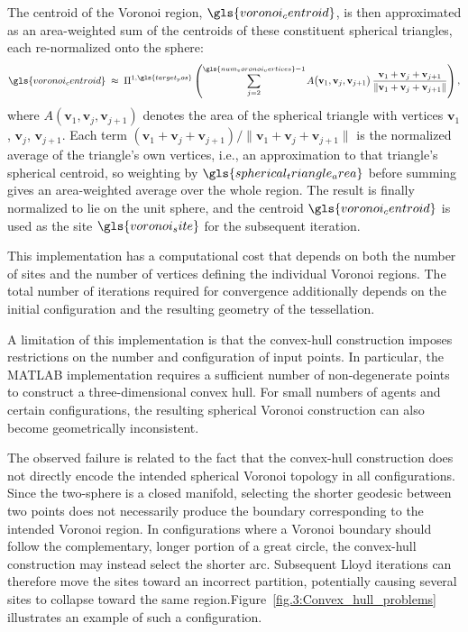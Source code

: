 The centroid of the Voronoi region, $\gls{voronoi_centroid}$, is then approximated as
an area-weighted sum of the centroids of these constituent spherical
triangles, each re-normalized onto the sphere:
\begin{equation}
\gls{voronoi_centroid} \;\approx\; \Pi^{1,\gls{target_pos}} \left( 
    \sum_{j=2}^{\gls{num_voronoi_vertices}-1}
    A \big(\mathbf{v}_1, \mathbf{v}_j, \mathbf{v}_{j+1}\big)\,
    \frac{\mathbf{v}_1 + \mathbf{v}_j + \mathbf{v}_{j+1}}{\left\| \mathbf{v}_1 + \mathbf{v}_j + \mathbf{v}_{j+1} \right\|}
\right)
,
\end{equation}
where $A(\mathbf{v}_1, \mathbf{v}_j, \mathbf{v}_{j+1})$
denotes the area of the spherical triangle with vertices $\mathbf{v}_1$, $\mathbf{v}_j$,
$\mathbf{v}_{j+1}$. Each term
$(\mathbf{v}_1 + \mathbf{v}_j + \mathbf{v}_{j+1})/\|\mathbf{v}_1 + \mathbf{v}_j + \mathbf{v}_{j+1}\|$
is the normalized average of the triangle's own vertices, i.e., an approximation to
that triangle's spherical centroid, so weighting by $\gls{spherical_triangle_area}$
before summing gives an area-weighted average over the whole region. The result is
finally normalized to lie on the unit sphere, and the centroid $\gls{voronoi_centroid}$ is used as
the site $\gls{voronoi_site}$ for the subsequent iteration.

This implementation has a computational cost that depends on both the number of sites and the number of vertices defining the individual Voronoi regions. The total number of iterations required for convergence additionally depends on the initial configuration and the resulting geometry of the tessellation.

A limitation of this implementation is that the convex-hull construction imposes restrictions on the number and configuration of input points. In particular, the MATLAB implementation requires a sufficient number of non-degenerate points to construct a three-dimensional convex hull. For small numbers of agents and certain configurations, the resulting spherical Voronoi construction can also become geometrically inconsistent.

The observed failure is related to the fact that the convex-hull construction does not directly encode the intended spherical Voronoi topology in all configurations. Since the two-sphere is a closed manifold, selecting the shorter geodesic between two points does not necessarily produce the boundary corresponding to the intended Voronoi region. In configurations where a Voronoi boundary should follow the complementary, longer portion of a great circle, the convex-hull construction may instead select the shorter arc. Subsequent Lloyd iterations can therefore move the sites toward an incorrect partition, potentially causing several sites to collapse toward the same region.Figure~\ref{fig.3:Convex_hull_problems} illustrates an example of such a configuration.


